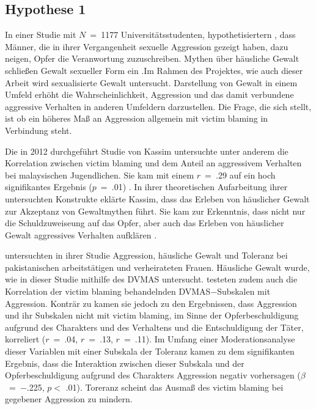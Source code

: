 \subsection{Hypothese 1}  \label{subsec_2.2.1}
In einer Studie mit $N$~=~1177 Universitätsstudenten, hypothetisiertern \textcite{H1_1993}, dass Männer, die in ihrer Vergangenheit sexuelle Aggression gezeigt haben, dazu neigen, Opfer die Veranwortung zuzuschreiben. Mythen über häusliche Gewalt schließen Gewalt sexueller Form ein \parencite{H1_Poli_2022}.Im Rahmen des Projektes, wie auch dieser Arbeit wird sexualisierte Gewalt untersucht. Darstellung von Gewalt in einem Umfeld erhöht die Wahrscheinlichkeit, Aggression und das damit verbundene aggressive Verhalten in anderen Umfeldern darzustellen. Die Frage, die sich stellt, ist ob ein höheres Maß an Aggression allgemein mit victim blaming in Verbindung steht.

Die in 2012 durchgeführt Studie von Kassim untersuchte unter anderem die Korrelation zwischen victim blaming und dem Anteil an aggressivem Verhalten bei malaysischen Jugendlichen. Sie kam mit einem $r$~=~.29 auf ein hoch signifikantes Ergebnis ($p$~=~.01) \parencite{H1_malasia_2012}. In ihrer theoretischen Aufarbeitung ihrer untersuchten Konstrukte eklärte Kassim, dass das Erleben von häuslicher Gewalt zur Akzeptanz von Gewaltmythen führt. Sie kam zur Erkenntnis, dass nicht nur die Schuldzuweiseung auf das Opfer, aber auch das Erleben von häuslicher Gewalt aggressives Verhalten aufklären \parencite{H1_malasia_2012}.

\textcite{H1_moderation_2020} untersuchten in ihrer Studie Aggression, häusliche Gewalt und Toleranz bei pakistanischen arbeitstätigen und verheirateten Frauen. Häusliche Gewalt wurde, wie in dieser Studie mithilfe des DVMAS untersucht. \textcite{H1_moderation_2020} testeten zudem auch die Korrelation der victim blaming behandelnden DVMAS$-$Subskalen mit Aggression. Konträr zu \textcite{H1_malasia_2012} kamen sie jedoch zu den Ergebnissen, dass Aggression und ihr Subskalen nicht mit victim blaming, im Sinne der Opferbeschuldigung aufgrund des Charakters und des Verhaltens und die Entschuldigung der Täter, korreliert ($r$~=~.04, $r$~=~.13, $r$~=~.11). Im Umfang einer Moderationsanalyse dieser Variablen mit einer Subskala der Toleranz kamen \textcite{H1_moderation_2020} zu dem signifikanten Ergebnis, dass die Interaktion zwischen dieser Subskala und der Opferbeschuldigung aufgrund des Charakters Aggression negativ vorhersagen ($\beta$~=~$-$.225, $p<$ .01). Toreranz scheint das Ausmaß des victim blaming bei gegebener Aggression zu mindern.

